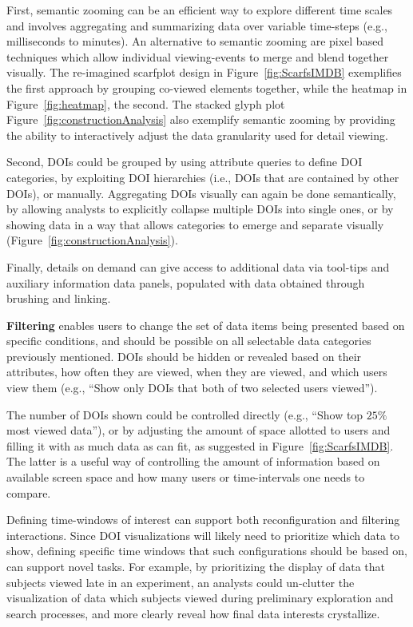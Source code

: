 First, semantic zooming can be an efficient way to explore different time scales and involves aggregating and summarizing data over variable time-steps (e.g., milliseconds to minutes). An alternative to semantic zooming are pixel based techniques which allow individual viewing-events to merge and blend together visually\cite{keim2000designing}. The re-imagined scarfplot design in Figure~\ref{fig:ScarfsIMDB} exemplifies the first approach by grouping co-viewed elements together, while the heatmap in Figure~\ref{fig:heatmap}, the second. The stacked glyph plot Figure~\ref{fig:constructionAnalysis} also exemplify semantic zooming by providing the ability to interactively adjust the data granularity used for detail viewing.  

Second, DOIs could be grouped by using attribute queries to define DOI categories, by exploiting DOI hierarchies (i.e., DOIs that are contained by other DOIs), or manually. Aggregating DOIs visually can again be done semantically, by allowing analysts to explicitly collapse multiple DOIs into single ones, or by showing data in a way that allows categories to emerge and separate visually (Figure~\ref{fig:constructionAnalysis}). 

 Finally, details on demand can give access to additional data via tool-tips and auxiliary information data panels, populated with data obtained through brushing and linking.
  
	
\noindent \textbf{Filtering} enables users to change the set of data items being presented based on specific conditions, and should be possible on all selectable data categories previously mentioned. DOIs should be hidden or revealed based on their attributes, how often they are viewed, when they are viewed, and which users view them (e.g., ``Show only DOIs that both of two selected users viewed'').

The number of DOIs shown could be controlled directly (e.g., ``Show top $25\%$ most viewed data''), or by adjusting the amount of space allotted to users and filling it with as much data as can fit, as suggested in Figure~\ref{fig:ScarfsIMDB}. The latter is a useful way of controlling the amount of information based on available screen space and how many users or time-intervals one needs to compare.

Defining time-windows of interest can support both reconfiguration and filtering interactions. Since DOI visualizations will likely need to prioritize which data to show, defining specific time windows that such configurations should be based on, can support novel tasks. For example, by prioritizing the display of data that subjects viewed late in an experiment, an analysts could un-clutter the visualization of data which subjects viewed during preliminary exploration and search processes, and more clearly reveal how final data interests crystallize.


